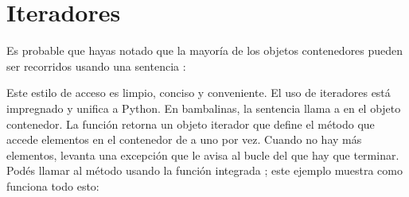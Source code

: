 \documentclass[a5paper,10pt,spanish]{sphinxmanual}
\begin{document}
\section{Iteradores}
\label{\detokenize{tutorial/classes:iterators}}\label{\detokenize{tutorial/classes:tut-iterators}}
\sphinxAtStartPar
Es probable que hayas notado que la mayoría de los objetos contenedores pueden ser recorridos usando una sentencia :

\begin{sphinxVerbatim}[commandchars=\\\{\}]
   \PYG{p}{[}  \PYG{p}{]}
     
    
   
   
     
\end{sphinxVerbatim}

\sphinxAtStartPar
Este estilo de acceso es limpio, conciso y conveniente.  El uso de iteradores está impregnado y unifica a Python.  En bambalinas, la sentencia  llama a  en el objeto contenedor.  La función retorna un objeto iterador que define el método  que accede elementos en el contenedor de a uno por vez.  Cuando no hay más elementos,  levanta una excepción  que le avisa al bucle del  que hay que terminar.  Podés llamar al método  usando la función integrada ; este ejemplo muestra como funciona todo esto:
\end{document}
